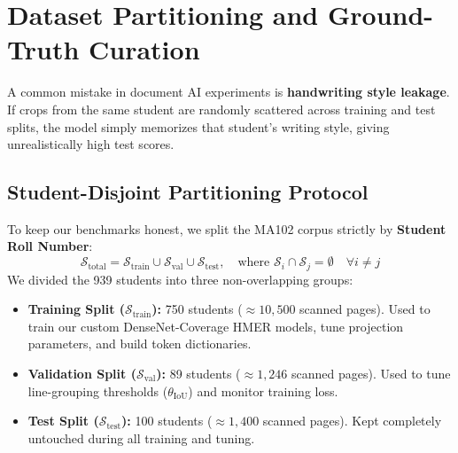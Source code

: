 \section{Dataset Partitioning and Ground-Truth Curation}
\label{sec:dataset_partitioning}

A common mistake in document AI experiments is \textbf{handwriting style leakage}. If crops from the same student are randomly scattered across training and test splits, the model simply memorizes that student's writing style, giving unrealistically high test scores.

\subsection{Student-Disjoint Partitioning Protocol}
To keep our benchmarks honest, we split the MA102 corpus strictly by \textbf{Student Roll Number}:
\begin{equation}
\mathcal{S}_{\text{total}} = \mathcal{S}_{\text{train}} \cup \mathcal{S}_{\text{val}} \cup \mathcal{S}_{\text{test}}, \quad \text{where } \mathcal{S}_i \cap \mathcal{S}_j = \emptyset \quad \forall i \neq j
\end{equation}
We divided the 939 students into three non-overlapping groups:
\begin{itemize}
    \item \textbf{Training Split ($\mathcal{S}_{\text{train}}$):} 750 students ($\approx 10,500$ scanned pages). Used to train our custom DenseNet-Coverage HMER models, tune projection parameters, and build token dictionaries.
    \item \textbf{Validation Split ($\mathcal{S}_{\text{val}}$):} 89 students ($\approx 1,246$ scanned pages). Used to tune line-grouping thresholds ($\theta_{\text{IoU}}$) and monitor training loss.
    \item \textbf{Test Split ($\mathcal{S}_{\text{test}}$):} 100 students ($\approx 1,400$ scanned pages). Kept completely untouched during all training and tuning.
\end{itemize}

